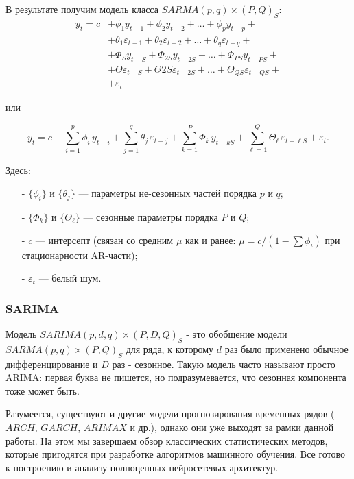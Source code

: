 В результате получим модель класса $SARMA(p, q) \times (P, Q)_S$:
\begin{align*}
    y_t = c &+ \phi_1 y_{t-1} + \phi_2 y_{t-2} + \dots + \phi_p y_{t-p} + \\
    &+ \theta_1 \varepsilon_{t-1} + \theta_2 \varepsilon_{t-2} + \dots + \theta_q \varepsilon_{t-q} + \\
    &+ \Phi_S y_{t-S} + \Phi_{2S} y_{t-2S} + \dots + \Phi_{PS} y_{t-PS} + \\
    &+ \Theta \varepsilon_{t-S} + \Theta{2S} \varepsilon_{t-2S} + \dots + \Theta_{QS} \varepsilon_{t-QS} +\\
    &+ \varepsilon_t 
\end{align*}

\begin{flushleft}
    или
\end{flushleft}
\vspace{-5pt}
\begin{equation*}
    y_t = c
    + \sum_{i=1}^p \phi_i\,y_{t-i}
    + \sum_{j=1}^q \theta_j\,\varepsilon_{t-j}
    + \sum_{k=1}^P \Phi_k\,y_{t-kS}
    + \sum_{\ell=1}^Q \Theta_\ell\,\varepsilon_{t-\ell S}
    + \varepsilon_t.
\end{equation*}

Здесь:
\begin{itemize}
    \item[-] \(\{\phi_i\}\) и \(\{\theta_j\}\) — параметры не-сезонных частей порядка \(p\) и \(q\);  
    \item[-] \(\{\Phi_k\}\) и \(\{\Theta_\ell\}\) — сезонные параметры порядка \(P\) и \(Q\);  
    \item[-] \(c\) — интерсепт (связан со средним \(\mu\) как и ранее: \(\mu = c/(1-\sum\phi_i)\) 
    при стационарности AR-части);  
    \item[-] \(\varepsilon_t\) — белый шум.  
\end{itemize}

\subsubsection{SARIMA}

Модель $SARIMA(p, d, q) \times (P, D, Q)_S$ - это обобщение модели $SARMA(p, q) \times (P, Q)_S$ для ряда, 
к которому $d$ раз было применено обычное дифференцирование и $D$ раз - сезонное. 
Такую модель часто называют просто ARIMA:
первая буква не пишется, но подразумевается, что сезонная компонента тоже может быть.

Разумеется, существуют и другие модели прогнозирования временных рядов  ($ARCH$, $GARCH$, 
$ARIMAX$ и др.), однако они уже выходят за рамки данной работы. На этом мы завершаем обзор 
классических статистических методов, которые пригодятся при разработке алгоритмов машинного обучения. 
Все готово к построению и анализу полноценных нейросетевых архитектур.

